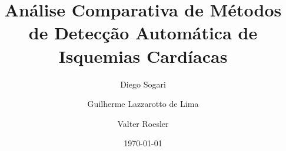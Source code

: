 
\title[Trabalho de Graduação II]{
    Análise Comparativa de Métodos de Detecção Automática de Isquemias Cardíacas
}
\author[D. Sogari]{
    Diego Sogari \and Guilherme Lazzarotto de Lima \and Valter Roesler
}

\date[2014]{\today}

\frame{\maketitle}